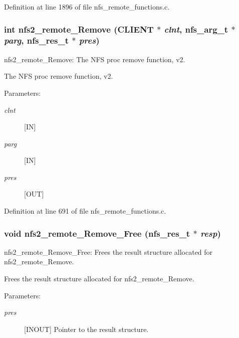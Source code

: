 Definition at line 1896 of file nfs\_\-remote\_\-functions.c.
\subsubsection[{nfs2\_\-remote\_\-Remove}]{\setlength{\rightskip}{0pt plus 5cm}int nfs2\_\-remote\_\-Remove (CLIENT $\ast$ {\em clnt}, \/  nfs\_\-arg\_\-t $\ast$ {\em parg}, \/  nfs\_\-res\_\-t $\ast$ {\em pres})}\label{group__NFSprocs_gcf4d75778b0bbfcf4a232b6a0dd09d20}


nfs2\_\-remote\_\-Remove: The NFS proc remove function, v2.

The NFS proc remove function, v2.

\begin{Desc}
\item[Parameters:]
\begin{description}
\item[{\em clnt}][IN] \item[{\em parg}][IN] \item[{\em pres}][OUT] \end{description}
\end{Desc}


Definition at line 691 of file nfs\_\-remote\_\-functions.c.
\subsubsection[{nfs2\_\-remote\_\-Remove\_\-Free}]{\setlength{\rightskip}{0pt plus 5cm}void nfs2\_\-remote\_\-Remove\_\-Free (nfs\_\-res\_\-t $\ast$ {\em resp})}\label{group__NFSprocs_ge159e5f39aa0b8634ff833e7c1cd3491}


nfs2\_\-remote\_\-Remove\_\-Free: Frees the result structure allocated for nfs2\_\-remote\_\-Remove.

Frees the result structure allocated for nfs2\_\-remote\_\-Remove.

\begin{Desc}
\item[Parameters:]
\begin{description}
\item[{\em pres}][INOUT] Pointer to the result structure. \end{description}
\end{Desc}


